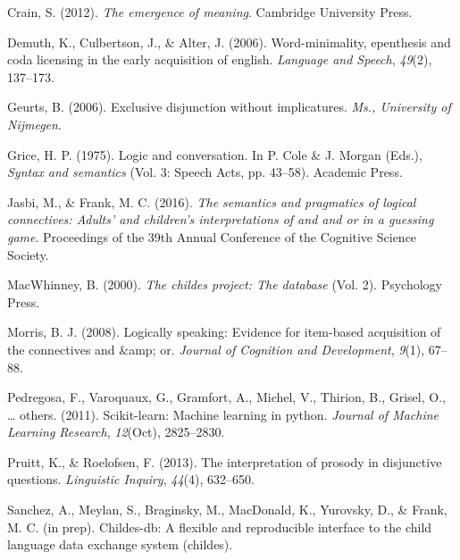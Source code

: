 \documentclass[10pt, letterpaper]{article}
\begin{document}
\hypertarget{ref-crain2012emergence}{}
Crain, S. (2012). \emph{The emergence of meaning}. Cambridge University
Press.

\hypertarget{ref-demuth2006word}{}
Demuth, K., Culbertson, J., \& Alter, J. (2006). Word-minimality,
epenthesis and coda licensing in the early acquisition of english.
\emph{Language and Speech}, \emph{49}(2), 137--173.

\hypertarget{ref-geurts2006exclusive}{}
Geurts, B. (2006). Exclusive disjunction without implicatures.
\emph{Ms., University of Nijmegen}.

\hypertarget{ref-grice1975logicconvo}{}
Grice, H. P. (1975). Logic and conversation. In P. Cole \& J. Morgan
(Eds.), \emph{Syntax and semantics} (Vol. 3: Speech Acts, pp. 43--58).
Academic Press.

\hypertarget{ref-jasbi2016cogsci}{}
Jasbi, M., \& Frank, M. C. (2016). \emph{The semantics and pragmatics of
logical connectives: Adults' and children's interpretations of and and
or in a guessing game}. Proceedings of the 39th Annual Conference of the
Cognitive Science Society.

\hypertarget{ref-macwhinney2000childes}{}
MacWhinney, B. (2000). \emph{The childes project: The database} (Vol.
2). Psychology Press.

\hypertarget{ref-morris2008logically}{}
Morris, B. J. (2008). Logically speaking: Evidence for item-based
acquisition of the connectives and \&amp; or. \emph{Journal of Cognition
and Development}, \emph{9}(1), 67--88.

\hypertarget{ref-pedregosa2011scikit}{}
Pedregosa, F., Varoquaux, G., Gramfort, A., Michel, V., Thirion, B.,
Grisel, O., \ldots{} others. (2011). Scikit-learn: Machine learning in
python. \emph{Journal of Machine Learning Research}, \emph{12}(Oct),
2825--2830.

\hypertarget{ref-pruitt2013interpretation}{}
Pruitt, K., \& Roelofsen, F. (2013). The interpretation of prosody in
disjunctive questions. \emph{Linguistic Inquiry}, \emph{44}(4),
632--650.

\hypertarget{ref-childesdb}{}
Sanchez, A., Meylan, S., Braginsky, M., MacDonald, K., Yurovsky, D., \&
Frank, M. C. (in prep). Childes-db: A flexible and reproducible
interface to the child language data exchange system (childes).
\end{document}
